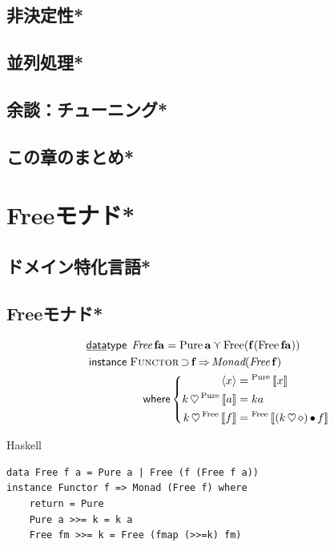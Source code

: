 \documentclass[a5paper,twoside,fleqn]{jsbook}
\def\[{\left[\!\left[}
\def\]{\right]\!\right]}
\newcommand{\programminglanguage}[1]{\textsf{#1}}
\newcommand{\haskell}{\programminglanguage{Haskell}}
\newenvironment{haskellcode}{\begin{itembox}[r]{\haskell}}{\end{itembox}}
\newcommand{\mKeyword}[1]{\mathsf{#1}} %
\newcommand{\mKeywordUnderline}[1]{\text{\underline{\textsf{#1}}}} %
\newcommand{\mDataTypeKeyword}{\mKeywordUnderline{data}\mKeyword{type}}
\newcommand{\mInstanceKeyword}{\mKeyword{instance}}
\newcommand{\mWhereKeyword}{\mKeyword{where}}
\DeclareMathOperator{\mDataType}{\mDataTypeKeyword}
\DeclareMathOperator{\mInstance}{\mInstanceKeyword}
\DeclareMathOperator{\mSuperClass}{\Rightarrow}
\DeclareMathOperator{\mSuperSet}{\supset}
\DeclareMathOperator{\mWhere}{\mWhereKeyword}
\newcommand{\mAnonParam}{\diamond}
\DeclareMathOperator{\mBind}{\heartsuit}
\DeclareMathOperator{\mMap}{\bullet}
\DeclareMathOperator{\mValueOr}{\curlyvee}
\newcommand{\mType}[1]{\mathbf{#1}}
\newcommand{\mTypeConstructor}[1]{\textit{#1}}
\newcommand{\mGenericValueConstructor}[1]{\mathrm{#1}}
\newcommand{\mGenericWith}[2]{{}^\mGenericValueConstructor{#1}\[#2\]}
\newcommand{\mPureWith}[1]{\langle#1\rangle}
\newcommand{\mGenericTypeClass}[1]{\textsc{#1}} %
\newcommand{\mFunctorTypeClass}{\mGenericTypeClass{Functor}}
\begin{document}
\section{非決定性*}
\section{並列処理*}
\section{余談：チューニング*}
\section{この章のまとめ*}


\chapter{Freeモナド*}
\section{ドメイン特化言語*}
\section{Freeモナド*}
\begin{align}
\mDataType\;&\mathop{\mTypeConstructor{Free}}\mType{f}\mType{a}=\mathop{\mGenericValueConstructor{Pure}}\mType{a}\mValueOr\mathop{\mGenericValueConstructor{Free}(\mType{f}(\mathop{\mGenericValueConstructor{Free}}\mType{f}\mType{a}))}\\
\mInstance\;&\mFunctorTypeClass\mSuperSet\mType{f}\mSuperClass\mTypeConstructor{Monad}(\mathop{\mTypeConstructor{Free}}\mType{f})\nonumber\\
&\quad\mWhere\left\{
\begin{aligned}
\mPureWith{x}&=\mGenericWith{Pure}{x}\\
k\mBind\mGenericWith{Pure}{a}&=ka\\
k\mBind\mGenericWith{Free}{f}&=\mGenericWith{Free}{(k\mBind\mAnonParam)\mMap f}
\end{aligned}
\right.
\end{align}

\begin{haskellcode}
\begin{verbatim}
data Free f a = Pure a | Free (f (Free f a))
instance Functor f => Monad (Free f) where
    return = Pure
    Pure a >>= k = k a
    Free fm >>= k = Free (fmap (>>=k) fm)
\end{verbatim}
\end{haskellcode}
\end{document}

